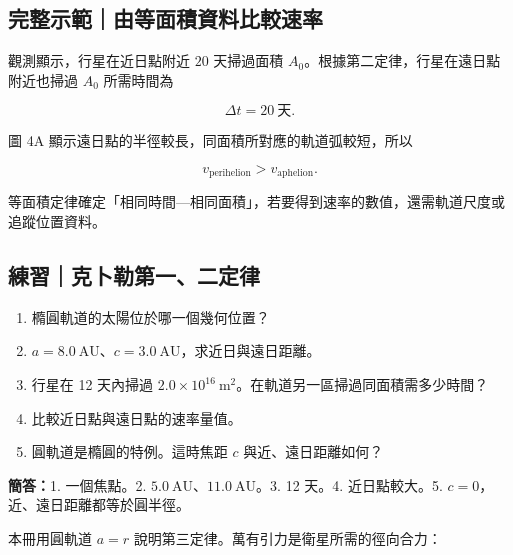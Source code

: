 \documentclass[11pt,a4paper]{article}
\providecommand{\tightlist}{%
  \setlength{\itemsep}{0pt}\setlength{\parskip}{0pt}}
\begin{document}
\begin{HandoutWorkedExample}

\subsection{完整示範｜由等面積資料比較速率}\label{ux5b8cux6574ux793aux7bc4ux7531ux7b49ux9762ux7a4dux8cc7ux6599ux6bd4ux8f03ux901fux7387}

觀測顯示，行星在近日點附近 \(20\) 天掃過面積 \(A_0\)。根據第二定律，行星在遠日點附近也掃過 \(A_0\) 所需時間為

\[
\Delta t=20\ \text{天}.
\]

圖 4A 顯示遠日點的半徑較長，同面積所對應的軌道弧較短，所以

\[
v_{\mathrm{perihelion}}>v_{\mathrm{aphelion}}.
\]

等面積定律確定「相同時間---相同面積」，若要得到速率的數值，還需軌道尺度或追蹤位置資料。

\end{HandoutWorkedExample}

\begin{HandoutSelfCheck}

\subsection{練習｜克卜勒第一、二定律}\label{ux7df4ux7fd2ux514bux535cux52d2ux7b2cux4e00ux4e8cux5b9aux5f8b}

\begin{enumerate}
\def\labelenumi{\arabic{enumi}.}
\tightlist
\item
  橢圓軌道的太陽位於哪一個幾何位置？
\item
  \(a=8.0\ \mathrm{AU}\)、\(c=3.0\ \mathrm{AU}\)，求近日與遠日距離。
\item
  行星在 12 天內掃過 \(2.0\times10^{16}\ \mathrm{m^2}\)。在軌道另一區掃過同面積需多少時間？
\item
  比較近日點與遠日點的速率量值。
\item
  圓軌道是橢圓的特例。這時焦距 \(c\) 與近、遠日距離如何？
\end{enumerate}

\textbf{簡答：}1. 一個焦點。2. \(5.0\ \mathrm{AU}\)、\(11.0\ \mathrm{AU}\)。3. 12 天。4. 近日點較大。5. \(c=0\)，近、遠日距離都等於圓半徑。

\end{HandoutSelfCheck}

本冊用圓軌道 \(a=r\) 說明第三定律。萬有引力是衛星所需的徑向合力：
\end{document}
